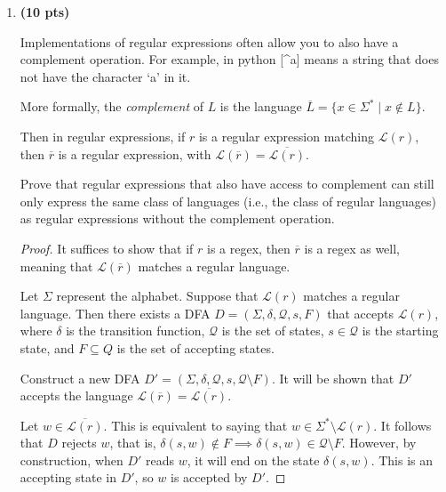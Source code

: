 \documentclass[11pt]{article}
\begin{document}
\begin{enumerate}[label=\textbf{Q\arabic*.}]
\begin{enumerate}[label=\textit{\alph*)}]
\begin{proof}
		Therefore, since this DFA accepts exactly \(L\), it is correct and the proof is done.
	\end{proof}
\end{enumerate}




\item \textbf{(10 pts)}

Implementations of regular expressions often allow you to also have a complement operation. For example, in python [\^{}a] means a string that does not have the character `a' in it. 

More formally,  the \textit{complement} of $L$ is the language $\overline{L} = \{x \in \Sigma^* \mid x \notin L\}$. 

Then in regular expressions, if $r$ is a regular expression matching $\mathcal{L}(r)$, then $\overline{r}$ is a regular expression, with $\mathcal{L}(\overline{r}) = \overline{\mathcal{L}(r)}$. 



Prove that regular expressions that also have access to complement can still only express the same class of languages (i.e., the class of regular languages) as regular expressions without the complement operation. 

\begin{proof}
	It suffices to show that if \(r\) is a regex, then \(\overline{r}\) is a regex as well, meaning that \(\mathcal{L} (\overline{r})\) matches a regular language.

	Let \(\Sigma\) represent the alphabet. Suppose that \(\mathcal{L} (r)\) matches a regular language. Then there exists a DFA \(D = (\Sigma, \delta, \mathcal{Q}, s, F)\) that accepts \(\mathcal{L} (r)\), where \(\delta\) is the transition function, \(\mathcal{Q}\) is the set of states, \(s \in \mathcal{Q}\) is the starting state, and \(F \subseteq Q\) is the set of accepting states.

	Construct a new DFA \(D' = (\Sigma , \delta , \mathcal{Q} , s, \mathcal{Q} \setminus F)\). It will be shown that \(D'\) accepts the language \(\mathcal{L} (\overline{r}) = \overline{\mathcal{L}(r)}\).

	Let \(w \in \overline{\mathcal{L} (r)}\). This is equivalent to saying that \(w \in \Sigma^* \setminus \mathcal{L} (r)\). It follows that \(D\) rejects \(w\), that is, \(\delta (s,w) \notin F \implies \delta (s,w) \in \mathcal{Q} \setminus F\). However, by construction, when \(D'\) reads \(w\), it will end on the state \(\delta (s,w)\). This is an accepting state in \(D'\), so \(w\) is accepted by \(D'\).


\end{proof}
\end{enumerate}
\end{document}
